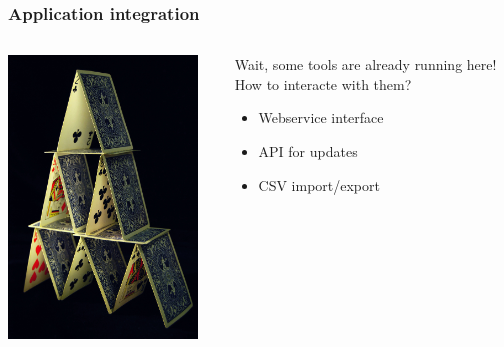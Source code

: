 \documentclass{beamer}
\begin{document}
\begin{frame}

    \frametitle{Application integration}
 \begin{columns}
 \begin{column}{0.45\textwidth}
         \includegraphics[height=7.5cm]{./pics/house_of_cards.jpg}
 \end{column}
 \begin{column}{0.45\textwidth}
     \begin{block}{Wait, some tools are already running here! \\
     How to interacte with them?}
        \begin{itemize}
            \item Webservice interface
            \item API for updates
            \item CSV import/export
        \end{itemize}
    \end{block}
   
 \end{column}
\end{columns}
\end{frame}
\end{document}
